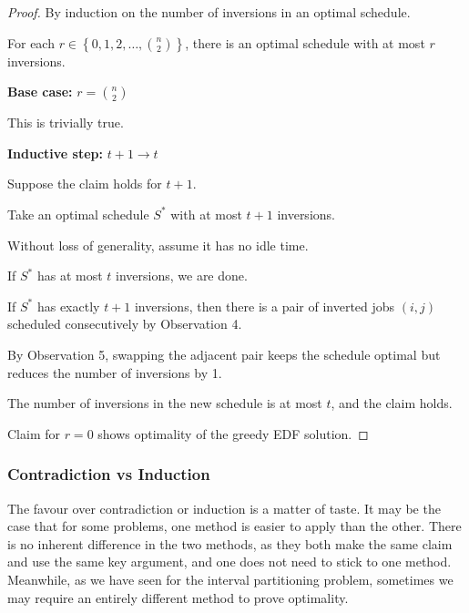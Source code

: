 \begin{proof}
    By induction on the number of inversions in an optimal schedule.

    \begin{claim}
        For each $r \in \left\{ 0, 1, 2, \dots, \binom{n}{2} \right\}$, there is an optimal schedule with at most $r$ inversions.
    \end{claim}

    \begin{listu}
        \item \textbf{Base case:} $r = \binom{n}{2}$

        This is trivially true.

        \item \textbf{Inductive step:} $t + 1 \to t$

        Suppose the claim holds for $t + 1$.

        Take an optimal schedule $S^*$ with at most $t + 1$ inversions.

        Without loss of generality, assume it has no idle time.

        \begin{listu}
            \item If $S^*$ has at most $t$ inversions, we are done.

            \item If $S^*$ has exactly $t + 1$ inversions, then there is a pair of inverted jobs $(i, j)$ scheduled consecutively by Observation 4.

            By Observation 5, swapping the adjacent pair keeps the schedule optimal but reduces the number of inversions by 1.

            The number of inversions in the new schedule is at most $t$, and the claim holds.
        \end{listu}
    \end{listu}

    Claim for $r = 0$ shows optimality of the greedy EDF solution.
\end{proof}

\subsubsection{Contradiction vs Induction}

The favour over contradiction or induction is a matter of taste. It may be the case that for some problems, one method is easier to apply than the other. There is no inherent difference in the two methods, as they both make the same claim and use the same key argument, and one does not need to stick to one method. Meanwhile, as we have seen for the interval partitioning problem, sometimes we may require an entirely different method to prove optimality.
